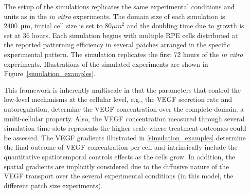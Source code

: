 The setup of the simulations replicates the same experimental conditions and units as in the \textit{in vitro} experiments. The domain size of each simulation is \SI{2400}{\micro\metre}, initial cell size is set to $80 \mu m^2$ and the doubling time due to growth is set at 36 hours. Each simulation begins with multiple RPE cells distributed at the reported patterning efficiency in several patches arranged in the specific experimental pattern. The simulation replicates the first 72 hours of the \textit{in vitro} experiments. Illustrations of the simulated experiments are shown in Figure~\ref{simulation_examples}.

This framework is inherently multiscale in that the parameters that control the low-level mechanisms at the cellular level, e.g., the VEGF secretion rate and autoregulation, determine the VEGF concentration over the complete domain, a multi-cellular property. Also, the VEGF concentration measured through several simulation time-slots represents the higher scale where treatment outcomes could be assessed. The VEGF gradients illustrated in \ref{simulation_examples} determine the final outcome of VEGF concentration per cell \cite{qanitabaker:Cao2007Spatiotemporal} and intrinsically include the quantitative spatiotemporal controls effects as the cells grow. In addition, the spatial gradients are implicitly considered due to the diffusive nature of the VEGF transport over the several experimental conditions (in this model, the different patch size experiments).

